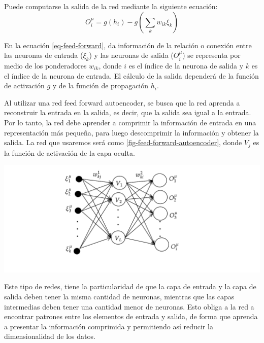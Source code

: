 \documentclass[aps,prl,reprint,groupedaddress]{revtex4-2}
\newenvironment{Figura}
  {\par\medskip\noindent\minipage{\linewidth}}
  {\endminipage\par\medskip}
\begin{document}
Puede computarse la salida de la red mediante la siguiente ecuación:
\begin{equation}
  O^{\mu}_{i} = g(h_{i}) - g \left( \sum_{k} w_{ik} \xi_{k} \right)
  \label{eq-feed-forward}
\end{equation}

En la ecuación \ref{eq-feed-forward}, da información de la relación o conexión 
entre las neuronas de entrada ($\xi_{k}$) y las neuronas de salida 
($O^{\mu}_{i}$) se representa por medio de los ponderadores $w_{ik}$, 
donde $i$ es el índice de la neurona de salida y $k$ es el índice de la 
neurona de entrada. El cálculo de la salida dependerá de la función de 
activación $g$ y de la función de propagación $h_{i}$.

Al utilizar una red feed forward autoencoder, se busca que la red aprenda a
reconstruir la entrada en la salida, es decir, que la salida sea igual a la 
entrada. Por lo tanto, la red debe aprender a comprimir la información de 
entrada en una representación más pequeña, para luego descomprimir la 
información y obtener la salida. La red que usaremos será como 
\ref{fig-feed-forward-autoencoder}, donde $V_{j}$ es la función de activación 
de la capa oculta.

\begin{Figura}
  \centering
  \includegraphics[width=1\textwidth]{figs/red-autoencoder.pdf}
  \label{fig-feed-forward-autoencoder}
\end{Figura}

Este tipo de redes, tiene la particularidad de que la capa de entrada y la capa 
de salida deben tener la misma cantidad de neuronas, mientras que las capas 
intermedias deben tener una cantidad menor de neuronas. Esto obliga a la red a 
encontrar patrones entre los elementos de entrada y salida, de forma que aprenda 
a presentar la información comprimida y permitiendo así reducir la dimensionalidad 
de los datos. 
\end{document}
